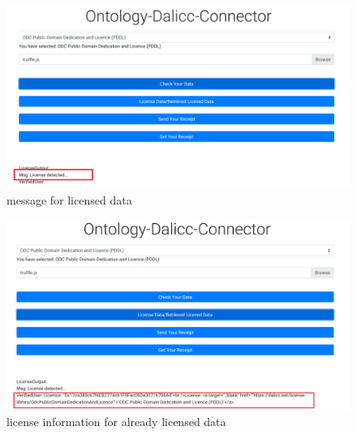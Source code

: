 \begin{center}
	\begin{figure}[htb!]
		
		\begin{minipage}{0.55\linewidth}
			\centering
			\includegraphics[width=1.95\textwidth]{images/chap03_found_license.png}
		\end{minipage}
		\caption[message for licensed data]{message for licensed data}
		
	\end{figure}
	
\end{center}
\begin{center}
	\begin{figure}[htb!]
		
		\begin{minipage}{0.55\linewidth}
			\centering
			\includegraphics[width=1.95\textwidth]{images/chap03_found_info.png}
		\end{minipage}
		\caption[license information for already licensed data]{license information for already licensed data}
		
	\end{figure}
	
\end{center}



